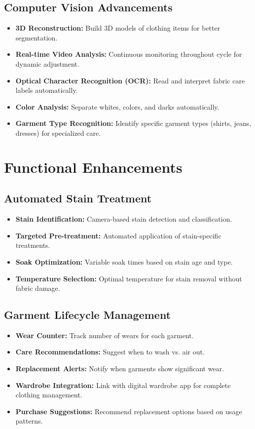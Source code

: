 \subsection{Computer Vision Advancements}
\begin{itemize}
    \item \textbf{3D Reconstruction:} Build 3D models of clothing items for better segmentation.
    \item \textbf{Real-time Video Analysis:} Continuous monitoring throughout cycle for dynamic adjustment.
    \item \textbf{Optical Character Recognition (OCR):} Read and interpret fabric care labels automatically.
    \item \textbf{Color Analysis:} Separate whites, colors, and darks automatically.
    \item \textbf{Garment Type Recognition:} Identify specific garment types (shirts, jeans, dresses) for specialized care.
\end{itemize}

\section{Functional Enhancements}

\subsection{Automated Stain Treatment}
\begin{itemize}
    \item \textbf{Stain Identification:} Camera-based stain detection and classification.
    \item \textbf{Targeted Pre-treatment:} Automated application of stain-specific treatments.
    \item \textbf{Soak Optimization:} Variable soak times based on stain age and type.
    \item \textbf{Temperature Selection:} Optimal temperature for stain removal without fabric damage.
\end{itemize}

\subsection{Garment Lifecycle Management}
\begin{itemize}
    \item \textbf{Wear Counter:} Track number of wears for each garment.
    \item \textbf{Care Recommendations:} Suggest when to wash vs. air out.
    \item \textbf{Replacement Alerts:} Notify when garments show significant wear.
    \item \textbf{Wardrobe Integration:} Link with digital wardrobe app for complete clothing management.
    \item \textbf{Purchase Suggestions:} Recommend replacement options based on usage patterns.
\end{itemize}

